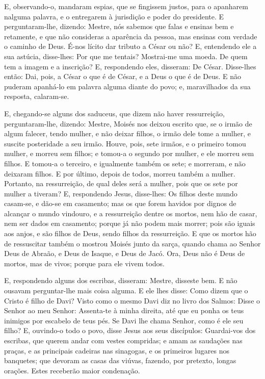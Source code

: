 E, observando-o, mandaram espias, que se fingissem justos, para o
apanharem nalguma palavra, e o entregarem à jurisdição e poder do
presidente. E perguntaram-lhe, dizendo: Mestre, nós sabemos
que falas e ensinas bem e retamente, e que não consideras a
aparência da pessoa, mas ensinas com verdade o caminho de Deus.
É-nos lícito dar tributo a César ou não? E, entendendo
ele a sua astúcia, disse-lhes: Por que me tentais? Mostrai-me
uma moeda. De quem tem a imagem e a inscrição? E, respondendo eles,
disseram: De César. Disse-lhes então: Dai, pois, a César o
que é de César, e a Deus o que é de Deus. E não puderam
apanhá-lo em palavra alguma diante do povo; e, maravilhados da sua
resposta, calaram-se.

E, chegando-se alguns dos saduceus, que dizem não haver
ressurreição, perguntaram-lhe, dizendo: Mestre, Moisés nos
deixou escrito que, se o irmão de algum falecer, tendo mulher, e não
deixar filhos, o irmão dele tome a mulher, e suscite posteridade a
seu irmão. Houve, pois, sete irmãos, e o primeiro tomou
mulher, e morreu sem filhos; e tomou-a o segundo por mulher,
e ele morreu sem filhos. E tomou-a o terceiro, e igualmente
também os sete; e morreram, e não deixaram filhos. E por
último, depois de todos, morreu também a mulher. Portanto, na
ressurreição, de qual deles será a mulher, pois que os sete por
mulher a tiveram? E, respondendo Jesus, disse-lhes: Os filhos
deste mundo casam-se, e dão-se em casamento; mas os que forem
havidos por dignos de alcançar o mundo vindouro, e a ressurreição
dentre os mortos, nem hão de casar, nem ser dados em casamento;
porque já não podem mais morrer; pois são iguais aos anjos, e
são filhos de Deus, sendo filhos da ressurreição. E que os
mortos hão de ressuscitar também o mostrou Moisés junto da sarça,
quando chama ao Senhor Deus de Abraão, e Deus de Isaque, e Deus de
Jacó. Ora, Deus não é Deus de mortos, mas de vivos; porque
para ele vivem todos.

E, respondendo alguns dos escribas, disseram: Mestre, disseste
bem. E não ousavam perguntar-lhe mais coisa alguma. E
ele lhes disse: Como dizem que o Cristo é filho de Davi?
Visto como o mesmo Davi diz no livro dos Salmos: Disse o
Senhor ao meu Senhor: Assenta-te à minha direita, até que eu
ponha os teus inimigos por escabelo de teus pés. Se Davi lhe
chama Senhor, como é ele seu filho? E, ouvindo-o todo o povo,
disse Jesus aos seus discípulos: Guardai-vos dos escribas,
que querem andar com vestes compridas; e amam as saudações nas
praças, e as principais cadeiras nas sinagogas, e os primeiros
lugares nos banquetes; que devoram as casas das viúvas,
fazendo, por pretexto, longas orações. Estes receberão maior
condenação.

